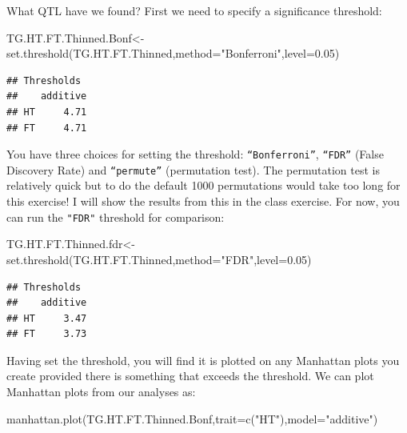 \documentclass[
]{book}
\newenvironment{Shaded}{\begin{snugshade}}{\end{snugshade}}
\newcommand{\AttributeTok}[1]{\textcolor[rgb]{0.77,0.63,0.00}{#1}}
\newcommand{\FloatTok}[1]{\textcolor[rgb]{0.00,0.00,0.81}{#1}}
\newcommand{\FunctionTok}[1]{\textcolor[rgb]{0.00,0.00,0.00}{#1}}
\newcommand{\NormalTok}[1]{#1}
\newcommand{\OtherTok}[1]{\textcolor[rgb]{0.56,0.35,0.01}{#1}}
\newcommand{\StringTok}[1]{\textcolor[rgb]{0.31,0.60,0.02}{#1}}
\begin{document}
What QTL have we found? First we need to specify a significance threshold:

\begin{Shaded}
\begin{Highlighting}[]
\NormalTok{TG.HT.FT.Thinned.Bonf}\OtherTok{\textless{}{-}}\FunctionTok{set.threshold}\NormalTok{(TG.HT.FT.Thinned,}\AttributeTok{method=}\StringTok{"Bonferroni"}\NormalTok{,}\AttributeTok{level=}\FloatTok{0.05}\NormalTok{)}
\end{Highlighting}
\end{Shaded}

\begin{verbatim}
## Thresholds
##    additive
## HT     4.71
## FT     4.71
\end{verbatim}

You have three choices for setting the threshold: \texttt{“Bonferroni”}, \texttt{“FDR”} (False Discovery Rate) and \texttt{“permute”} (permutation test). The permutation test is relatively quick but to do the default 1000 permutations would take too long for this exercise! I will show the results from this in the class exercise. For now, you can run the \texttt{"FDR"} threshold for comparison:

\begin{Shaded}
\begin{Highlighting}[]
\NormalTok{TG.HT.FT.Thinned.fdr}\OtherTok{\textless{}{-}}\FunctionTok{set.threshold}\NormalTok{(TG.HT.FT.Thinned,}\AttributeTok{method=}\StringTok{"FDR"}\NormalTok{,}\AttributeTok{level=}\FloatTok{0.05}\NormalTok{) }
\end{Highlighting}
\end{Shaded}

\begin{verbatim}
## Thresholds
##    additive
## HT     3.47
## FT     3.73
\end{verbatim}

Having set the threshold, you will find it is plotted on any Manhattan plots you create provided there is something that exceeds the threshold. We can plot Manhattan plots from our analyses as:

\begin{Shaded}
\begin{Highlighting}[]
\FunctionTok{manhattan.plot}\NormalTok{(TG.HT.FT.Thinned.Bonf,}\AttributeTok{trait=}\FunctionTok{c}\NormalTok{(}\StringTok{"HT"}\NormalTok{),}\AttributeTok{model=}\StringTok{"additive"}\NormalTok{) }
\end{Highlighting}
\end{Shaded}
\end{document}
